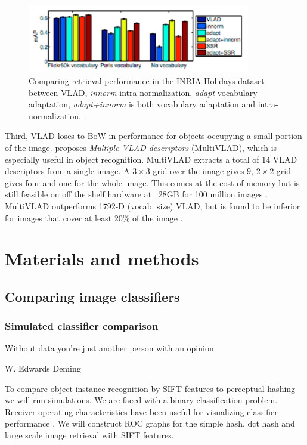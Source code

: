 \documentclass[english,12pt,a4paper,pdftex,elec,utf8]{aaltothesis}
\begin{document}
\begin{figure}[htb]
\begin{center}
\includegraphics[height=3cm]{figures/vladadapt}
\end{center}
\caption{Comparing retrieval performance in the INRIA Holidays dataset between VLAD, \emph{innorm} intra-normalization, \emph{adapt} vocabulary adaptation, \emph{adapt+innorm} is both vocabulary adaptation and intra-normalization. \cite{Arandjelovic2013}.}
\label{vladadapt}
\end{figure}

Third, VLAD loses to BoW in performance for objects occupying a small portion of the image. \cite{Arandjelovic2013} proposes \emph{Multiple VLAD descriptors} (MultiVLAD), which is especially useful in object recognition. MultiVLAD extracts a total of 14 VLAD descriptors from a single image. A $3 \times 3$ grid over the image gives $9$, $2 \times 2$ grid gives four and one for the whole image. This comes at the cost of memory but is still feasible on off the shelf hardware at ~28GB for 100 million images \cite{Arandjelovic2013}. MultiVLAD outperforms 1792-D (vocab. size) VLAD, but is found to be inferior for images that cover at least 20\% of the image \cite{Arandjelovic2013}.


\clearpage

\section{Materials and methods}
\subsection{Comparing image classifiers}
\subsubsection{Simulated classifier comparison}
\epigraph{Without data you're just another person with an opinion}{W. Edwards Deming}

To compare object instance recognition by SIFT features to perceptual hashing we will run simulations. We are faced with a binary classification problem. Receiver operating characteristics have been useful for visualizing classifier performance \cite{Fawcett2006}. We will construct ROC graphs for the simple hash, dct hash and large scale image retrieval with SIFT features.
\end{document}
